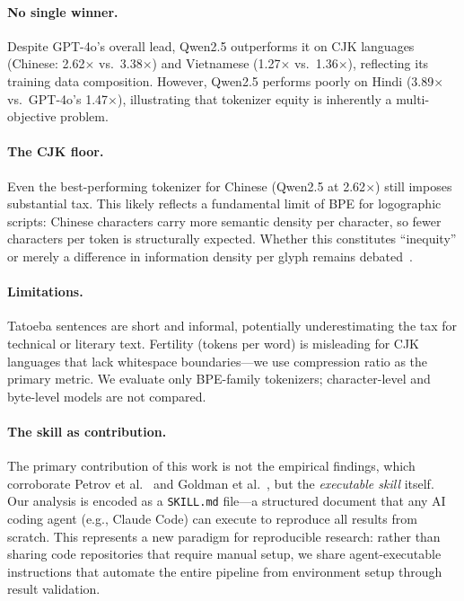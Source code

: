 \documentclass[11pt]{article}
\begin{document}
\paragraph{No single winner.}
Despite GPT-4o's overall lead, Qwen2.5 outperforms it on CJK languages (Chinese: 2.62$\times$ vs.\ 3.38$\times$) and Vietnamese (1.27$\times$ vs.\ 1.36$\times$), reflecting its training data composition.
However, Qwen2.5 performs poorly on Hindi (3.89$\times$ vs.\ GPT-4o's 1.47$\times$), illustrating that tokenizer equity is inherently a multi-objective problem.

\paragraph{The CJK floor.}
Even the best-performing tokenizer for Chinese (Qwen2.5 at 2.62$\times$) still imposes substantial tax.
This likely reflects a fundamental limit of BPE for logographic scripts: Chinese characters carry more semantic density per character, so fewer characters per token is structurally expected.
Whether this constitutes ``inequity'' or merely a difference in information density per glyph remains debated~\cite{goldman2024tokenization}.

\paragraph{Limitations.}
Tatoeba sentences are short and informal, potentially underestimating the tax for technical or literary text.
Fertility (tokens per word) is misleading for CJK languages that lack whitespace boundaries---we use compression ratio as the primary metric.
We evaluate only BPE-family tokenizers; character-level and byte-level models are not compared.

\paragraph{The skill as contribution.}
The primary contribution of this work is not the empirical findings, which corroborate Petrov et al.~\cite{petrov2023language} and Goldman et al.~\cite{goldman2024tokenization}, but the \emph{executable skill} itself.
Our analysis is encoded as a \texttt{SKILL.md} file---a structured document that any AI coding agent (e.g., Claude Code) can execute to reproduce all results from scratch.
This represents a new paradigm for reproducible research: rather than sharing code repositories that require manual setup, we share agent-executable instructions that automate the entire pipeline from environment setup through result validation.
\end{document}

